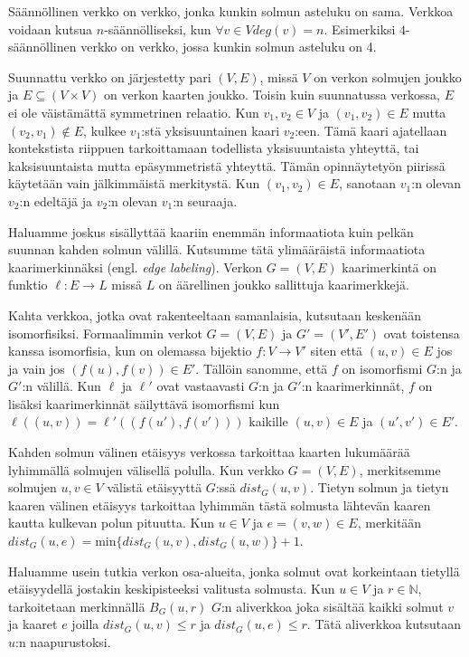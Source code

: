 \documentclass[12pt,finnish]{tktltiki2}
\theoremstyle{definition}
\theoremstyle{remark}
\begin{document}
Säännöllinen verkko on verkko, jonka kunkin solmun asteluku on sama. Verkkoa voidaan kutsua $n$-säännölliseksi, kun $\forall v \in V deg(v) = n$. Esimerkiksi $4$-säännöllinen verkko on verkko, jossa kunkin solmun asteluku on 4.

Suunnattu verkko on järjestetty pari $(V, E)$, missä $V$ on verkon solmujen joukko ja $E \subseteq (V \times V)$ on verkon kaarten joukko. Toisin kuin suunnatussa verkossa, $E$ ei ole väistämättä symmetrinen relaatio. Kun $v_1, v_2 \in V$ ja $(v_1, v_2) \in E$ mutta $(v_2, v_1) \notin E$, kulkee $v_1$:stä yksisuuntainen kaari $v_2$:een. Tämä kaari ajatellaan kontekstista riippuen tarkoittamaan todellista yksisuuntaista yhteyttä, tai kaksisuuntaista mutta epäsymmetristä yhteyttä. Tämän opinnäytetyön piirissä käytetään vain jälkimmäistä merkitystä. Kun $(v_1, v_2) \in E$, sanotaan $v_1$:n olevan $v_2$:n edeltäjä ja $v_2$:n olevan $v_1$:n seuraaja.

Haluamme joskus sisällyttää kaariin enemmän informaatiota kuin pelkän suunnan kahden solmun välillä. Kutsumme tätä ylimääräistä informaatiota kaarimerkinnäksi (engl. \textit{edge labeling}). Verkon $G = (V, E)$ kaarimerkintä on funktio $\ell: E \rightarrow L$ missä $L$ on äärellinen joukko sallittuja kaarimerkkejä.

Kahta verkkoa, jotka ovat rakenteeltaan samanlaisia, kutsutaan keskenään isomorfisiksi. Formaalimmin verkot $G = (V, E)$ ja $G' = (V', E')$ ovat toistensa kanssa isomorfisia, kun on olemassa bijektio $f: V \rightarrow V'$ siten että $(u, v) \in E$ jos ja vain jos $(f(u), f(v)) \in E'$. Tällöin sanomme, että $f$ on isomorfismi $G$:n ja $G'$:n välillä. Kun $\ell$ ja $\ell'$ ovat vastaavasti $G$:n ja $G'$:n kaarimerkinnät, $f$ on lisäksi kaarimerkinnät säilyttävä isomorfismi kun $\ell((u, v)) = \ell'((f(u'), f(v')))$ kaikille $(u, v) \in E$ ja $(u', v') \in E'$.

Kahden solmun välinen etäisyys verkossa tarkoittaa kaarten lukumäärää lyhimmällä solmujen välisellä polulla. Kun verkko $G = (V, E)$, merkitsemme solmujen $u, v \in V$ välistä etäisyyttä $G$:ssä $dist_G(u, v)$. Tietyn solmun ja tietyn kaaren välinen etäisyys tarkoittaa lyhimmän tästä solmusta lähtevän kaaren kautta kulkevan polun pituutta. Kun $u \in V$ ja $e = (v, w) \in E$, merkitään $dist_G(u, e) = \text{min}\{dist_G(u, v), dist_G(u, w)\} + 1$.

Haluamme usein tutkia verkon osa-alueita, jonka solmut ovat korkeintaan tietyllä etäisyydellä jostakin keskipisteeksi valitusta solmusta. Kun $u \in V$ ja $r \in \mathbb{N}$, tarkoitetaan merkinnällä $B_G(u, r)$ $G$:n aliverkkoa joka sisältää kaikki solmut $v$ ja kaaret $e$ joilla $dist_G(u, v) \leq r$ ja $dist_G(u, e) \leq r$. Tätä aliverkkoa kutsutaan $u$:n naapurustoksi.
\end{document}
